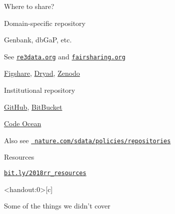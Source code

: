 \documentclass[12pt,t]{beamer}
\begin{document}
\begin{frame}[c]{Where to share?}

  \bi
\item Domain-specific repository
  \bi
  \item Genbank, dbGaP, etc.
  \item See \href{https://re3data.org}{\tt re3data.org} and
    \href{https://fairsharing.org}{\tt fairsharing.org}
  \ei
\item \href{https://figshare.com}{Figshare}, \href{https://datadryad.org}{Dryad}, \href{https://zenodo.org}{Zenodo}
\item Institutional repository
  \item \href{https://github.com}{GitHub}, \href{https://bitbucket.org}{BitBucket}
  \item \href{https://codeocean.com/}{Code Ocean}
  \ei

  \bigskip

  Also see
  \href{https://www.nature.com/sdata/policies/repositories}{\tt
    nature.com/sdata/policies/repositories}

\end{frame}


\begin{frame}[c]{Resources}


\centerline{  \href{https://bit.ly/2018rr_resources}{\Large \tt bit.ly/2018rr\_resources} }



\end{frame}


\begin{frame}<handout:0>[c]{}

  \begin{center}
    \large
    Some of the things we didn't cover
  \end{center}
\end{frame}
\end{document}
